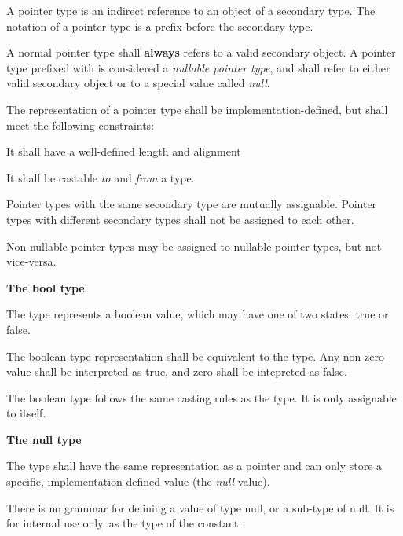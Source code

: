 \specsubsubitem
A pointer type is an indirect reference to an object of a secondary type. The
notation of a pointer type is a \terminal{*} prefix before the secondary type.

\specsubsubitem
A normal pointer type shall \textbf{always} refers to a valid secondary object.
A pointer type prefixed with  is considered a
\textit{nullable pointer type}, and shall refer to either valid secondary object
or to a special value called \textit{null}.

\specsubsubitem
The representation of a pointer type shall be implementation-defined, but shall
meet the following constraints:

\begin{subsubitemize}
\item It shall have a well-defined length and alignment
\item It shall be castable \textit{to} and \textit{from} a  type.
\end{subsubitemize}

\specsubsubitem
Pointer types with the same secondary type are mutually assignable. Pointer
types with different secondary types shall not be assigned to each other.

\specsubsubitem
Non-nullable pointer types may be assigned to nullable pointer types, but not
vice-versa.


\textbf{The bool type}

\specsubsubitem
The  type represents a boolean value, which may have one of two
states: true or false.

\specsubsubitem
The boolean type representation shall be equivalent to the  type.
Any non-zero value shall be interpreted as true, and zero shall be intepreted as
false.

\specsubsubitem
The boolean type follows the same casting rules as the  type. It
is only assignable to itself.

\textbf{The null type}

\specsubsubitem
The  type shall have the same representation as a pointer and can
only store a specific, implementation-defined value (the \textit{null} value).

\specsubsubitem
There is no grammar for defining a value of type null, or a sub-type of null. It
is for internal use only, as the type of the  constant.


